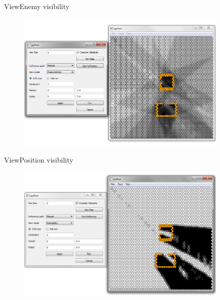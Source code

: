 \begin{frame}{View}{Enemy visibility}

\begin{figure}
\centering
\includegraphics[width = 0.9\textwidth]{./screenshot/enemy_visibility_view.png}
\end{figure}

\end{frame}

\begin{frame}{View}{Position visibility}

\begin{figure}
\centering
\includegraphics[width = 0.9\textwidth]{./screenshot/position_visibility_view1.png}
\end{figure}

\end{frame}

